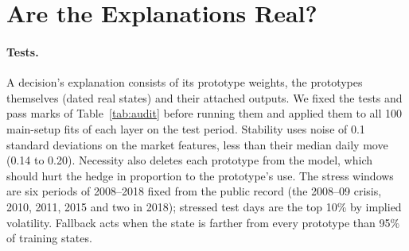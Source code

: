 \documentclass[runningheads]{llncs}
\newcommand{\pass}{\checkmark}
\newcommand{\fail}{$\times$}
\begin{document}
\section{Are the Explanations Real?}
\label{sec:explain}

\begin{table}[t]
\caption{Pre-declared explanation tests, test period 2022--2024, 100 fits per layer. Necessity: change of the decision in units of its standard deviation; sufficiency, self-consistency and
fallback: relative change of the spread or the output. \pass\ pass, \fail\ fail, by the mark recorded before
the run. For necessity the plain layer fails narrowly on the European call at the level of the whole hedge
(rank correlation 0.46 against a mark of 0.5). An untrained encoder with the same prototypes scores 65\% /
75\% on similarity.}
\label{tab:audit}
\centering
\scriptsize
\setlength{\tabcolsep}{3pt}

\end{table}

\paragraph{Tests.} A decision's explanation consists of its prototype weights, the prototypes themselves
(dated real states) and their attached outputs. We fixed the tests and pass marks of Table~\ref{tab:audit}
before running them and applied them to all 100 main-setup fits of each layer on the test period.
Stability uses noise of 0.1 standard deviations on the market features, less than their median daily move
(0.14 to 0.20). Necessity also deletes each prototype from the model, which should hurt the hedge in
proportion to the prototype's use. The stress windows are six periods of 2008--2018 fixed from the public
record (the 2008--09 crisis, 2010, 2011, 2015 and two in 2018); stressed test days are the top 10\% by
implied volatility. Fallback acts when the state is farther from every prototype than 95\% of training
states.
\end{document}

